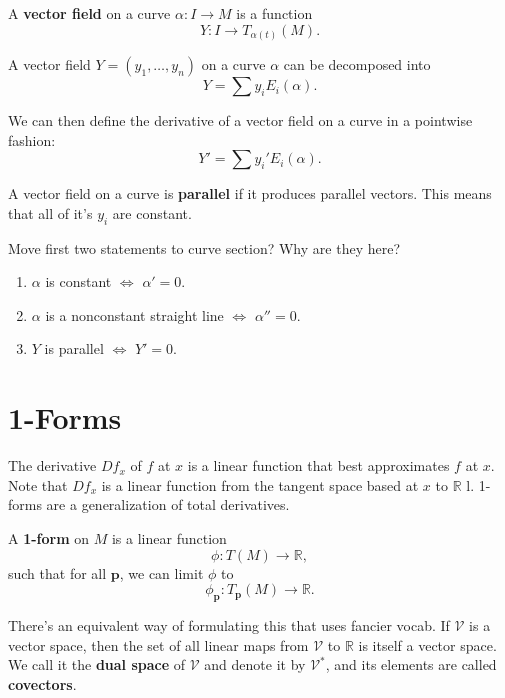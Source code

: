 \documentclass[twoside,10pt]{report}
\begin{document}
\begin{defn}[]
	A \textbf{vector field} on a curve $\alpha:I\to M$ is a function
	\[
		Y: I \to T_{\alpha(t)}(M).
	\]
\end{defn}

A vector field $Y=(y_1, \dots, y_n)$ on a curve $\alpha$ can be decomposed into
\[
	Y = \sum y_i E_i(\alpha).
\] 

We can then define the derivative of a vector field on a curve in a pointwise fashion:
\[
	Y' = \sum y_i' E_i(\alpha).
\] 

A vector field on a curve is \textbf{parallel} if it produces parallel vectors. This means that all of it's $y_i$ are constant.

\begin{prop}
	{\color{red}Move first two statements to curve section? Why are they here?}
	\begin{enumerate}
		\item $\alpha$ is constant $\iff$ $\alpha'=0$.
		\item $\alpha$ is a nonconstant straight line $\iff$ $\alpha''=0$.
		\item $Y$ is parallel $\iff$ $Y'=0$.
	\end{enumerate}
\end{prop}



\section{1-Forms}

The derivative $Df_{x}$ of $f$ at $x$ is a linear function that best approximates $f$ at $x$. Note that $Df_{x}$ is a linear function from the tangent space based at $x$ to $\mathbb{R}$ l. 1-forms are a generalization of total derivatives.

\begin{defn}
A \textbf{1-form} on $M$ is a linear function
\[
	\phi:T(M)\to \mathbb{R},
\] such that for all $\mathbf{p}$, we can limit $\phi$ to
\[
	\phi_\mathbf{p}:T_{\mathbf{p}}(M)\to \mathbb{R}.
\] 
\end{defn}

There's an equivalent way of formulating this that uses fancier vocab. If $\mathcal{V}$ is a vector space, then the set of all linear maps from $\mathcal{V}$ to $\mathbb{R}$ is itself a vector space. We call it the \textbf{dual space} of $\mathcal{V}$ and denote it by $\mathcal{V}^*$, and its elements are called \textbf{covectors}.
\end{document}
